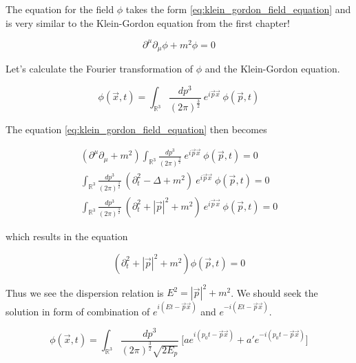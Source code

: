 The equation for the field $\phi$ takes the form \ref{eq:klein_gordon_field_equation} and is very similar to the Klein-Gordon
equation from the first chapter!

\begin{equation}
    \label{eq:klein_gordon_field_equation}
    \partial^{\mu} \partial_{\mu} \phi + m^2 \phi = 0
\end{equation}

Let's calculate the Fourier transformation of $\phi$ and the Klein-Gordon equation.

\begin{equation}
    \phi (\vec{x}, t) = \int_{\mathbb{R}^{3}} \frac{dp^{3}}{(2 \pi)^{\frac{3}{2}}} \ e^{i \vec{p} \vec{x}} \ \phi (\vec{p}, t)
\end{equation}

The equation \ref{eq:klein_gordon_field_equation} then becomes

\begin{equation*}
    \begin{gathered}
        (\partial^{\mu} \partial_{\mu} + m^2) \int_{\mathbb{R}^{3}} \frac{dp^{3}}{(2 \pi)^{\frac{3}{2}}} \ e^{i \vec{p} \vec{x}} \ \phi (\vec{p}, t) = 0 \\
        \int_{\mathbb{R}^{3}} \frac{dp^{3}}{(2 \pi)^{\frac{3}{2}}} \ (\partial_{t}^{2} - \Delta + m^2) \ e^{i \vec{p} \vec{x}} \ \phi (\vec{p}, t) = 0 \\
        \int_{\mathbb{R}^{3}} \frac{dp^{3}}{(2 \pi)^{\frac{3}{2}}} \ (\partial_{t}^{2} + | \vec{p} |^{2} + m^2) \ e^{i \vec{p} \vec{x}} \ \phi (\vec{p}, t) = 0
    \end{gathered}
\end{equation*}

which results in the equation

\begin{equation*}
    (\partial_{t}^{2} + | \vec{p} |^{2} + m^2) \phi (\vec{p}, t) = 0
\end{equation*}

Thus we see the dispersion relation is $E^{2} = | \vec{p} |^{2} + m^2$. We should seek the solution in form of combination of $e^{i (E t - \vec{p} \vec{x})}$
and $e^{- i (E t - \vec{p} \vec{x})}$.

\begin{equation*}
    \phi (\vec{x}, t) = \int_{\mathbb{R}^{3}} \frac{dp^{3}}{(2 \pi)^{\frac{3}{2}} \sqrt{2 E_{p}}} \ \bigg[a e^{i (p_{0} t - \vec{p} \vec{x})} + a' e^{- i (p_{0} t - \vec{p} \vec{x})}\bigg]
\end{equation*}

